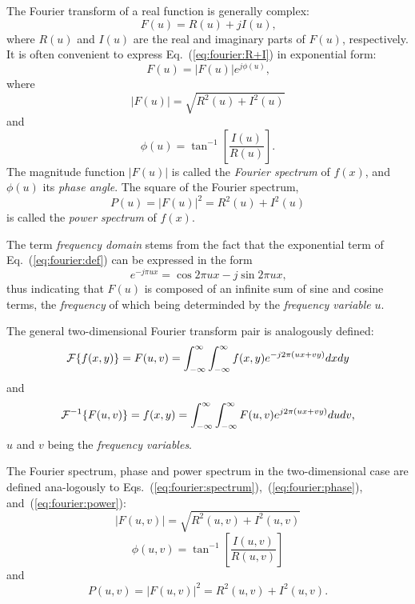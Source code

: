 The Fourier transform of a real function is generally complex:
\begin{equation}
\label{eq:fourier:R+I}
  F(u)=R(u)+jI(u)\mbox{,}
\end{equation}
where $R(u)$ and $I(u)$ are the real and imaginary parts of $F(u)$,
respectively.  It is often convenient to express
Eq.~(\ref{eq:fourier:R+I}) in exponential form:
\begin{equation}
  F(u)=|F(u)|e^{j\phi(u)}\mbox{,}
\end{equation}
where
\begin{equation}
\label{eq:fourier:spectrum}
  |F(u)|=\sqrt{R^{2}(u)+I^{2}(u)}
\end{equation}
and
\begin{equation}
\label{eq:fourier:phase}
  \phi(u)=\tan^{-1}\left[\frac{I(u)}{R(u)}\right]\mbox{.}
\end{equation}
The magnitude function $|F(u)|$ is called the {\em Fourier spectrum\/}
of $f(x)$, and $\phi(u)$ its {\em phase angle\/}.  The square of the
Fourier spectrum,
\begin{equation}
\label{eq:fourier:power}
  P(u)=|F(u)|^{2}=R^{2}(u)+I^{2}(u)
\end{equation}
is called the {\em power spectrum\/} of $f(x)$.

The term {\em frequency domain\/} stems from the fact that the
exponential term of Eq.~(\ref{eq:fourier:def}) can be expressed in the
form
\begin{equation}
  e^{-j\pi ux}=\cos 2\pi ux-j\sin 2\pi ux\mbox{,}
\end{equation}
thus indicating that $F(u)$ is composed of an infinite sum of sine and
cosine terms, the {\em frequency\/} of which being determinded by the
{\em frequency variable\/} $u$.

The general two-dimensional Fourier transform pair is analogously
defined:
\begin{equation}
  {\cal F}\{f(x,y)\}=F(u,v)=\int_{-\infty}^{\infty}
  \int_{-\infty}^{\infty}f(x,y)e^{-j2\pi(ux+vy)}dxdy
\end{equation}
and
\begin{equation}
  {\cal F}^{-1}\{F(u,v)\}=f(x,y)=\int_{-\infty}^{\infty}
  \int_{-\infty}^{\infty}F(u,v)e^{j2\pi(ux+vy)}dudv\mbox{,}
\end{equation}
$u$ and $v$ being the {\em frequency variables\/}.

The Fourier spectrum, phase and power spectrum in the two-dimensional
case are defined ana-logously to
Eqs.~(\ref{eq:fourier:spectrum}),~(\ref{eq:fourier:phase}),
and~(\ref{eq:fourier:power}):
\begin{equation}
\label{eq:fourier:spectrum2}
  |F(u,v)|=\sqrt{R^{2}(u,v)+I^{2}(u,v)}
\end{equation}
\begin{equation}
\label{eq:fourier:phase2}
  \phi(u,v)=\tan^{-1}\left[\frac{I(u,v)}{R(u,v)}\right]
\end{equation}
and
\begin{equation}
\label{eq:fourier:power2}
  P(u,v)=|F(u,v)|^{2}=R^{2}(u,v)+I^{2}(u,v)\mbox{.}
\end{equation}

